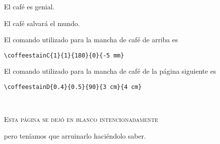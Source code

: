 \documentclass[a4paper, 11pt, BCOR = 0 pt, oneside]{scrartcl}
\begin{document}
El café es genial.

\vspace{5mm}

\noindent
El café salvará el mundo.

\vfill{}

\begin{tcolorbox}
El comando utilizado para la mancha de café de arriba es

  \verb|\coffeestainC{1}{1}{180}{0}{-5 mm}|
\end{tcolorbox}

\begin{tcolorbox}
El comando utilizado para la mancha de café de la página siguiente es

  \verb|\coffeestainD{0.4}{0.5}{90}{3 cm}{4 cm}|
\end{tcolorbox}

\newpage{}
\pagestyle{empty}
~\\

\label{stainD}

\vfill{}
\begin{center}
\textsc{Esta página se dejó en blanco intencionadamente}

pero teníamos que arruinarlo haciéndolo saber.
\end{center}

\vfill{}
\end{document}
